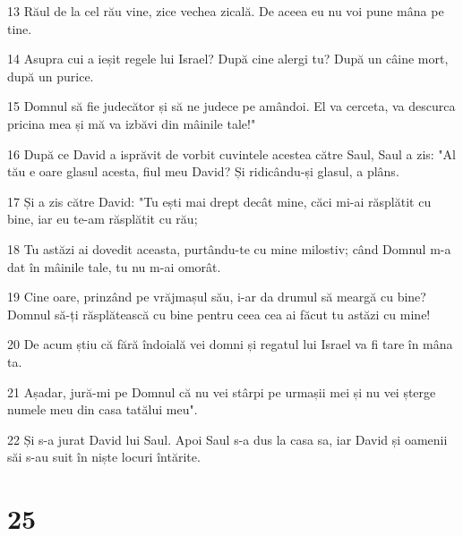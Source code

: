\par 13 Răul de la cel rău vine, zice vechea zicală. De aceea eu nu voi pune mâna pe tine.
\par 14 Asupra cui a ieșit regele lui Israel? După cine alergi tu? După un câine mort, după un purice.
\par 15 Domnul să fie judecător și să ne judece pe amândoi. El va cerceta, va descurca pricina mea și mă va izbăvi din mâinile tale!"
\par 16 După ce David a isprăvit de vorbit cuvintele acestea către Saul, Saul a zis: "Al tău e oare glasul acesta, fiul meu David? Și ridicându-și glasul, a plâns.
\par 17 Și a zis către David: "Tu ești mai drept decât mine, căci mi-ai răsplătit cu bine, iar eu te-am răsplătit cu rău;
\par 18 Tu astăzi ai dovedit aceasta, purtându-te cu mine milostiv; când Domnul m-a dat în mâinile tale, tu nu m-ai omorât.
\par 19 Cine oare, prinzând pe vrăjmașul său, i-ar da drumul să meargă cu bine? Domnul să-ți răsplătească cu bine pentru ceea cea ai făcut tu astăzi cu mine!
\par 20 De acum știu că fără îndoială vei domni și regatul lui Israel va fi tare în mâna ta.
\par 21 Așadar, jură-mi pe Domnul că nu vei stârpi pe urmașii mei și nu vei șterge numele meu din casa tatălui meu".
\par 22 Și s-a jurat David lui Saul. Apoi Saul s-a dus la casa sa, iar David și oamenii săi s-au suit în niște locuri întărite.

\chapter{25}

